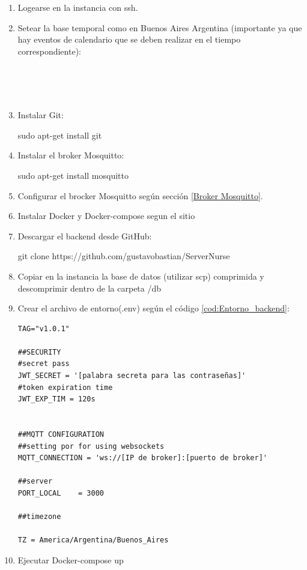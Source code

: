 \begin{enumerate}


\item Logearse en la instancia con ssh.
\item Setear la base temporal como en Buenos Aires Argentina (importante ya que hay eventos de calendario que se deben realizar en el tiempo correspondiente):\\
\begin{itemize}


 	 \\
	\mid {} \\
	 \\
\end{itemize}	
\item Instalar Git:

	sudo apt-get install git
\item Instalar el broker Mosquitto:
	
	sudo apt-get install mosquitto
\item Configurar el brocker Mosquitto según sección \ref{Broker Mosquitto}.
\item Instalar Docker y Docker-compose segun el sitio\citep{WEBSITE:8}
\item Descargar el backend desde GitHub:

	git clone  https://github.com/gustavobastian/ServerNurse
\item Copiar en la instancia la base de datos (utilizar scp) comprimida y descomprimir dentro de la carpeta /db
\pagebreak
\item Crear el archivo de entorno(.env) según el código \ref{cod:Entorno_backend}:


\begin{lstlisting}[label=cod:Entorno_backend,caption=  Entorno del backend]
TAG="v1.0.1"

##SECURITY
#secret pass
JWT_SECRET = '[palabra secreta para las contraseñas]'
#token expiration time
JWT_EXP_TIM = 120s


##MQTT CONFIGURATION
##setting por for using websockets
MQTT_CONNECTION = 'ws://[IP de broker]:[puerto de broker]'

##server
PORT_LOCAL    = 3000

##timezone

TZ = America/Argentina/Buenos_Aires 
\end{lstlisting}


\item Ejecutar Docker-compose up
\end{enumerate}

